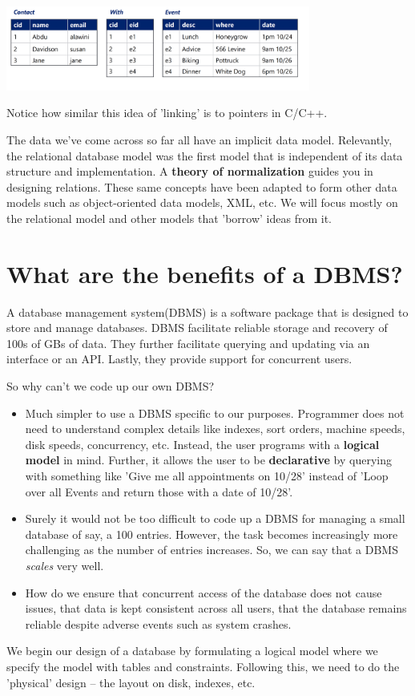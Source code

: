 \documentclass{article}
\begin{document}
\includegraphics[width = 10cm]{assets/calendarExample.png}

Notice how similar this idea of 'linking' is to pointers in C/C++.

The data we've come across so far all have an implicit data model. Relevantly, the relational database model was the first model that is independent of its data structure and implementation. A \textbf{theory of normalization} guides you in designing relations. These same concepts have been adapted to form other data models such as object-oriented data models, XML, etc. We will focus mostly on the relational model and other models that 'borrow' ideas from it. 

\section*{What are the benefits of a DBMS?}
A database management system(DBMS) is a software package that is designed to store and manage databases. DBMS facilitate reliable storage and recovery of 100s of GBs of data. They further facilitate querying and updating via an interface or an API. Lastly, they provide support for concurrent users.

So why can't we code up our own DBMS?
\begin{itemize}
    \item Much simpler to use a DBMS specific to our purposes. Programmer does not need to understand complex details like indexes, sort orders, machine speeds, disk speeds, concurrency, etc. Instead, the user programs with a \textbf{logical model} in mind. Further, it allows the user to be \textbf{declarative} by querying with something like 'Give me all appointments on 10/28' instead of 'Loop over all Events and return those with a date of 10/28'.
    \item Surely it would not be too difficult to code up a DBMS for managing a small database of say, a 100 entries. However, the task becomes increasingly more challenging as the number of entries increases. So, we can say that a DBMS \textit{scales} very well.
    \item How do we ensure that concurrent access of the database does not cause issues, that data is kept consistent across all users, that the database remains reliable despite adverse events such as system crashes.
\end{itemize}
We begin our design of a database by formulating a logical model where we specify the model with tables and constraints. Following this, we need to do the 'physical' design -- the layout on disk, indexes, etc.
\end{document}
